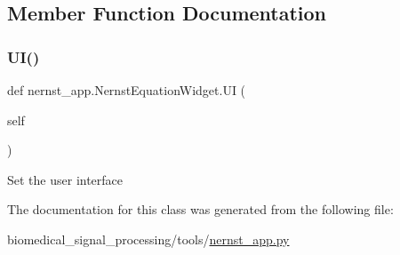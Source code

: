 \subsection{Member Function Documentation}
\mbox{\label{classnernst__app_1_1NernstEquationWidget_a883d90598b1a75b6b4f9eac8f31e39fa}} 
\subsubsection{\texorpdfstring{U\+I()}{UI()}}
{\footnotesize\ttfamily def nernst\+\_\+app.\+Nernst\+Equation\+Widget.\+UI (\begin{DoxyParamCaption}\item[{}]{self }\end{DoxyParamCaption})}

\begin{DoxyVerb}Set the user interface
\end{DoxyVerb}
 

The documentation for this class was generated from the following file\+:\begin{DoxyCompactItemize}
\item 
biomedical\+\_\+signal\+\_\+processing/tools/\hyperlink{nernst__app_8py}{nernst\+\_\+app.\+py}\end{DoxyCompactItemize}
